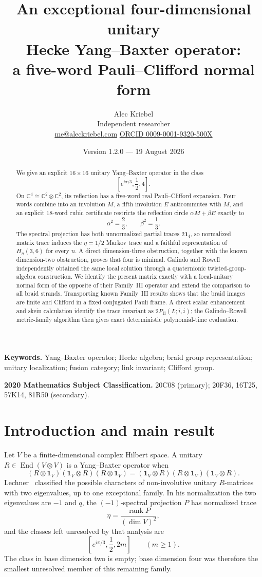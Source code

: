 \documentclass[11pt]{article}
\title{\vspace{-1.4cm}\textbf{An exceptional four-dimensional unitary}\\[0.2em]
\textbf{Hecke Yang--Baxter operator:}\\[0.2em]
\textbf{a five-word Pauli--Clifford normal form}}
\author{Alec Kriebel\\[-0.1em]
\small Independent researcher\\[-0.1em]
\small \href{mailto:me@aleckriebel.com}{me@aleckriebel.com}
\quad\textperiodcentered\quad
\href{https://orcid.org/0009-0001-9320-500X}{ORCID 0009-0001-9320-500X}}
\date{Version 1.2.0 --- 19 August 2026}
\theoremstyle{remark}
\newcommand{\Id}{\mathbf 1}
\newcommand{\End}{\operatorname{End}}
\newcommand{\rank}{\operatorname{rank}}
\newcommand{\bbC}{\mathbb C}
\begin{document}
\maketitle

\begin{abstract}
We give an explicit \(16\times16\) unitary Yang--Baxter operator in the class
\[
  \left[e^{i\pi/3},\frac12,4\right].
\]
On \(\bbC^4\cong\bbC^2\otimes\bbC^2\), its reflection has a five-word real
Pauli--Clifford expansion.  Four words combine into an involution \(M\), a fifth
involution \(E\) anticommutes with \(M\), and an explicit \(18\)-word cubic
certificate restricts the reflection circle \(\alpha M+\beta E\) exactly to
\[
  \alpha^2=\frac23,\qquad \beta^2=\frac13.
\]
The spectral projection has both unnormalized partial traces \(2\Id_4\), so
normalized matrix trace induces the \(\eta=1/2\) Markov trace and a faithful
representation of \(H_n(3,6)\) for every \(n\).  A direct dimension-three
obstruction, together with the known dimension-two obstruction, proves that
four is minimal.  Galindo and Rowell independently obtained the same local
solution through a quaternionic twisted-group-algebra construction.  We
identify the present matrix exactly with a local-unitary normal form of the
opposite of their Family~III operator and extend the comparison to all braid
strands.  Transporting known Family~III results shows that the braid images are
finite and Clifford in a fixed conjugated Pauli frame.  A direct scalar
enhancement and skein calculation identify the trace invariant as
\(2P_{\mathrm H}(L;i,i)\); the Galindo--Rowell metric-family algorithm then
gives exact deterministic polynomial-time evaluation.
\end{abstract}

\medskip
\noindent\textbf{Keywords.}
Yang--Baxter operator; Hecke algebra; braid group representation; unitary
localization; fusion category; link invariant; Clifford group.

\smallskip
\noindent\textbf{2020 Mathematics Subject Classification.}
20C08 (primary); 20F36, 16T25, 57K14, 81R50 (secondary).

\section{Introduction and main result}

Let \(V\) be a finite-dimensional complex Hilbert space.  A unitary
\(R\in\End(V\otimes V)\) is a Yang--Baxter operator when
\begin{equation}
  (R\otimes\Id_V)(\Id_V\otimes R)(R\otimes\Id_V)
  =
  (\Id_V\otimes R)(R\otimes\Id_V)(\Id_V\otimes R).
  \label{eq:ybe}
\end{equation}
Lechner~\cite{Lechner2026} classified the possible characters of
non-involutive unitary \(R\)-matrices with two eigenvalues, up to one
exceptional family.  In his normalization the two eigenvalues are
\(-1\) and \(q\), the \((-1)\)-spectral projection \(P\) has normalized
trace
\[
  \eta=\frac{\rank P}{(\dim V)^2},
\]
and the classes left unresolved by that analysis are
\[
  \left[e^{i\pi/3},\frac12,2m\right]\qquad(m\ge1).
\]
The class in base dimension two is empty; base dimension four was therefore
the smallest unresolved member of this remaining family.
\end{document}
